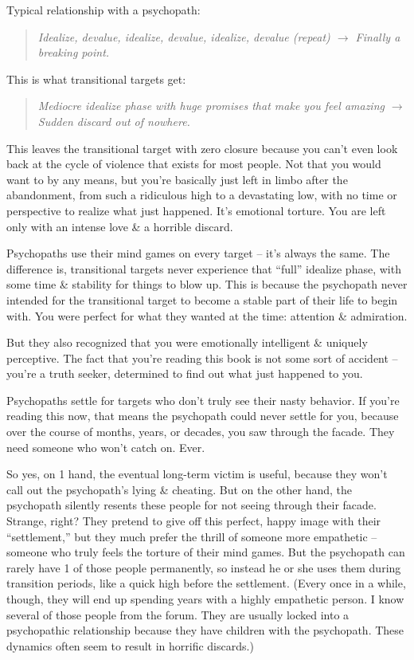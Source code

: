 \documentclass{article}
\numberwithin{equation}{section}
\begin{document}
Typical relationship with a psychopath:
\begin{quotation}\it
	Idealize, devalue, idealize, devalue, idealize, devalue (repeat) $\to$ Finally a breaking point.
\end{quotation}
This is what transitional targets get:
\begin{quotation}\it
	Mediocre idealize phase with huge promises that make you feel amazing $\to$ Sudden discard out of nowhere.
\end{quotation}
This leaves the transitional target with zero closure because you can't even look back at the cycle of violence that exists for most people. Not that you would want to by any means, but you're basically just left in limbo after the abandonment, from such a ridiculous high to a devastating low, with no time or perspective to realize what just happened. It's emotional torture. You are left only with an intense love \& a horrible discard.

Psychopaths use their mind games on every target -- it's always the same. The difference is, transitional targets never experience that ``full'' idealize phase, with some time \& stability for things to blow up. This is because the psychopath never intended for the transitional target to become a stable part of their life to begin with. You were perfect for what they wanted at the time: attention \& admiration.

But they also recognized that you were emotionally intelligent \& uniquely perceptive. The fact that you're reading this book is not some sort of accident -- you're a truth seeker, determined to find out what just happened to you.

Psychopaths settle for targets who don't truly see their nasty behavior. If you're reading this now, that means the psychopath could never settle for you, because over the course of months, years, or decades, you saw through the facade. They need someone who won't catch on. Ever.

So yes, on 1 hand, the eventual long-term victim is useful, because they won't call out the psychopath's lying \& cheating. But on the other hand, the psychopath silently resents these people for not seeing through their facade. Strange, right? They pretend to give off this perfect, happy image with their ``settlement,'' but they much prefer the thrill of someone more empathetic -- someone who truly feels the torture of their mind games. But the psychopath can rarely have 1 of those people permanently, so instead he or she uses them during transition periods, like a quick high before the settlement. (Every once in a while, though, they will end up spending years with a highly empathetic person. I know several of those people from the forum. They are usually locked into a psychopathic relationship because they have children with the psychopath. These dynamics often seem to result in horrific discards.)
\end{document}
